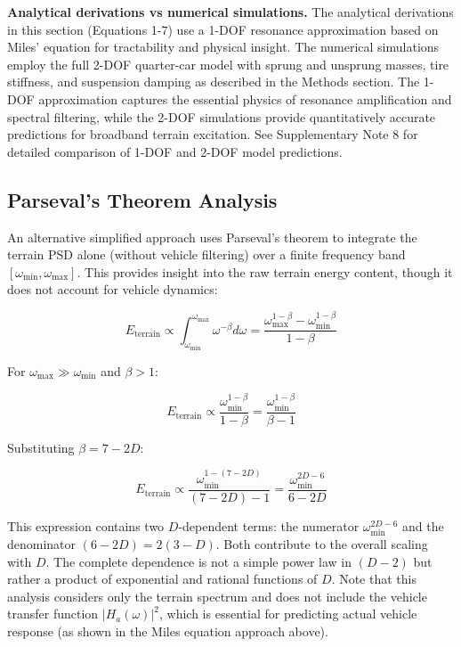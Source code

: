 \documentclass[11pt,letterpaper]{article}
\begin{document}
\textbf{Analytical derivations vs numerical simulations.} The analytical derivations in this section (Equations 1-7) use a 1-DOF resonance approximation based on Miles' equation for tractability and physical insight. The numerical simulations employ the full 2-DOF quarter-car model with sprung and unsprung masses, tire stiffness, and suspension damping as described in the Methods section. The 1-DOF approximation captures the essential physics of resonance amplification and spectral filtering, while the 2-DOF simulations provide quantitatively accurate predictions for broadband terrain excitation. See Supplementary Note 8 for detailed comparison of 1-DOF and 2-DOF model predictions.


\subsection{Parseval's Theorem Analysis}

An alternative simplified approach uses Parseval's theorem to integrate the terrain PSD alone (without vehicle filtering) over a finite frequency band $[\omega_{\min}, \omega_{\max}]$. This provides insight into the raw terrain energy content, though it does not account for vehicle dynamics:

\begin{equation}
E_{\text{terrain}} \propto \int_{\omega_{\min}}^{\omega_{\max}} \omega^{-\beta} d\omega = \frac{\omega_{\max}^{1-\beta} - \omega_{\min}^{1-\beta}}{1-\beta}
\end{equation}

For $\omega_{\max} \gg \omega_{\min}$ and $\beta > 1$:

\begin{equation}
E_{\text{terrain}} \propto \frac{\omega_{\min}^{1-\beta}}{1-\beta} = \frac{\omega_{\min}^{1-\beta}}{\beta-1}
\end{equation}

Substituting $\beta = 7-2D$:

\begin{equation}
E_{\text{terrain}} \propto \frac{\omega_{\min}^{1-(7-2D)}}{(7-2D)-1} = \frac{\omega_{\min}^{2D-6}}{6-2D}
\end{equation}

This expression contains two $D$-dependent terms: the numerator $\omega_{\min}^{2D-6}$ and the denominator $(6-2D) = 2(3-D)$. Both contribute to the overall scaling with $D$. The complete dependence is not a simple power law in $(D-2)$ but rather a product of exponential and rational functions of $D$. Note that this analysis considers only the terrain spectrum and does not include the vehicle transfer function $|H_a(\omega)|^2$, which is essential for predicting actual vehicle response (as shown in the Miles equation approach above).
\end{document}
